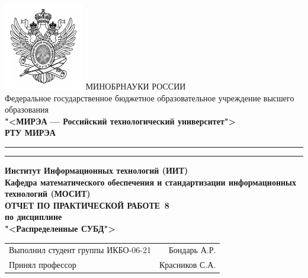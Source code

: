 \begin{titlepage}
	\thispagestyle{fancy}
	\renewcommand{\headrulewidth}{0pt}

	\centering
	\includegraphics[scale=0.5]{../res/logo} \break %
	МИНОБРНАУКИ РОССИИ\\
	Федеральное государственное бюджетное образовательное учреждение
	высшего образования\\
	\textbf{"<МИРЭА --- Российский технологический университет">}\\
	\textbf{РТУ МИРЭА}\\
	\bigskip \hrule \smallskip \hrule
	\vfill
	\vfill
	\textbf{Институт Информационных технологий (ИИТ)}\\
	\textbf{Кафедра математического обеспечения
		и стандартизации информационных технологий (МОСИТ)}\\
	\vfill
	\vfill
	\textbf{ОТЧЕТ ПО ПРАКТИЧЕСКОЙ РАБОТЕ \No\,8}\\
	\textbf{по дисциплине}\\
	\textbf{"<Распределенные СУБД">}
	\vfill
	\vfill
	\vfill
	\vfill
	\begin{tabular}{lr}
		Выполнил студент группы ИКБО-06-21 & Бондарь А.Р.\\
		Принял профессор & Красников С.А.\\
	\end{tabular}
	\vfill
	\vfill
	\vfill
\end{titlepage}
\setcounter{page}{2}
\clearpage

